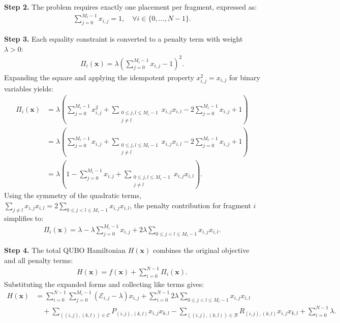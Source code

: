 \documentclass[12pt]{article}
\begin{document}
\textbf{Step 2.} The problem requires exactly one placement per fragment, expressed as:
\begin{align}
  \sum_{j=0}^{M_i-1} x_{i,j} = 1, \quad \forall i \in \{0, \dots, N-1\}.
\end{align}

\textbf{Step 3.} Each equality constraint is converted to a penalty term with weight $\lambda > 0$:
\begin{align}
  \Pi_i(\mathbf{x}) = \lambda \left( \sum_{j=0}^{M_i-1} x_{i,j} - 1 \right)^2.
\end{align}
Expanding the square and applying the idempotent property $x_{i,j}^2 = x_{i,j}$ for binary variables yields:
\begin{align}
  \Pi_i(\mathbf{x}) &= \lambda \left( \sum_{j=0}^{M_i-1} x_{i,j}^2 + \sum_{\substack{0 \le j, l \le M_i-1 \\ j \neq l}} x_{i,j} x_{i,l} - 2 \sum_{j=0}^{M_i-1} x_{i,j} + 1 \right) \\
  &= \lambda \left( \sum_{j=0}^{M_i-1} x_{i,j} + \sum_{\substack{0 \le j, l \le M_i-1 \\ j \neq l}} x_{i,j} x_{i,l} - 2 \sum_{j=0}^{M_i-1} x_{i,j} + 1 \right) \\
  &= \lambda \left( 1 - \sum_{j=0}^{M_i-1} x_{i,j} + \sum_{\substack{0 \le j, l \le M_i-1 \\ j \neq l}} x_{i,j} x_{i,l} \right).
\end{align}
Using the symmetry of the quadratic terms, $\sum_{j \neq l} x_{i,j} x_{i,l} = 2 \sum_{0 \le j < l \le M_i-1} x_{i,j} x_{i,l}$, the penalty contribution for fragment $i$ simplifies to:
\begin{align}
  \Pi_i(\mathbf{x}) = \lambda - \lambda \sum_{j=0}^{M_i-1} x_{i,j} + 2\lambda \sum_{0 \le j < l \le M_i-1} x_{i,j} x_{i,l}.
\end{align}

\textbf{Step 4.} The total QUBO Hamiltonian $H(\mathbf{x})$ combines the original objective and all penalty terms:
\begin{align}
  H(\mathbf{x}) = f(\mathbf{x}) + \sum_{i=0}^{N-1} \Pi_i(\mathbf{x}).
\end{align}
Substituting the expanded forms and collecting like terms gives:
\begin{align}
  H(\mathbf{x}) &= \sum_{i=0}^{N-1} \sum_{j=0}^{M_i-1} (\mathcal{E}_{i,j} - \lambda) x_{i,j} + \sum_{i=0}^{N-1} 2\lambda \sum_{0 \le j < l \le M_i-1} x_{i,j} x_{i,l} \nonumber \\
  &\quad + \sum_{((i,j),(k,l)) \in \mathcal{C}} P_{(i,j),(k,l)} x_{i,j} x_{k,l} - \sum_{((i,j),(k,l)) \in \mathcal{B}} R_{(i,j),(k,l)} x_{i,j} x_{k,l} + \sum_{i=0}^{N-1} \lambda.
\end{align}
\end{document}
